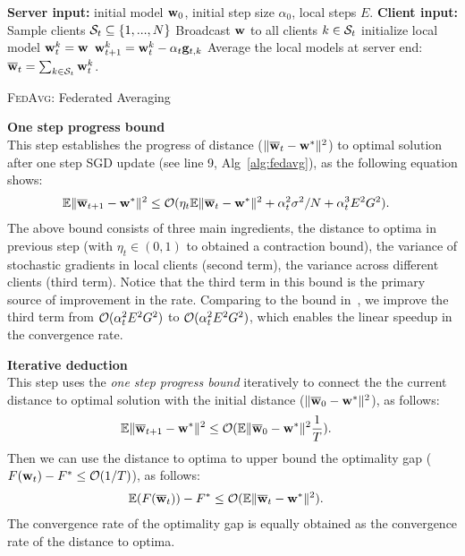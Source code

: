 \begin{algorithm}[h!]\small
\begin{algorithmic}[1]
\STATE \textbf{Server input:} initial model ${\mathbf{w}}_0$, initial step size $\alpha_0$, local steps $E$. 
\STATE \textbf{Client input:} 
\STATE  Sample clients ${\mathcal{S}}_t \subseteq \{1,...,N\}$
\STATE Broadcast ${\mathbf{w}}$ to all clients $k \in {\mathcal{S}}_t$
\STATE initialize local model ${\mathbf{w}}_t^k = {\mathbf{w}}$
\STATE ${\mathbf{w}}_{t+1}^{k}  ={\mathbf{w}}_{t}^{k}-\alpha_{t}{\mathbf{g}}_{t,k}$
\ENDFOR
\ENDFOR
\STATE Average the local models at server end: ${\overline{\mathbf{w}}}_t = \sum_{k\in {\mathcal{S}}_t} {\mathbf{w}}_t^k$.
\ENDFOR 
\end{algorithmic}
\caption{\textsc{FedAvg}: Federated Averaging}%
\label{alg:fedavg}
\end{algorithm}


\textbf{One step progress bound} \\ 
This step establishes the progress of distance ($\|{\overline{\mathbf{w}}}_{t}-{\mathbf{w}}^{\ast}\|^{2}$) to optimal solution after one step SGD update (see line 9, Alg~\ref{alg:fedavg}), as the following equation shows:
\begin{align*}
	\mathbb{E}\|{\overline{\mathbf{w}}}_{t+1}-{\mathbf{w}}^{\ast}\|^{2} & \leq {\mathcal{O}}(\eta_t\mathbb{E}\|{\overline{\mathbf{w}}}_{t}-{\mathbf{w}}^{\ast}\|^{2} + \alpha_t^2 \sigma^2/N + \alpha_t^3E^2G^2).
\end{align*}
The above bound consists of three main ingredients, the distance to optima
in previous step (with $\eta_t \in (0, 1)$ to obtained a contraction bound), 
the variance of stochastic gradients in local clients (second term), the variance
across different clients (third term). 
Notice that the third term in this bound is the primary source of improvement in the rate.  Comparing to the bound in~\cite{li2019convergence}, we improve 
the third term from ${\mathcal{O}}(\alpha_t^2E^2G^2)$ to ${\mathcal{O}}(\alpha_t^2E^2G^2)$, which enables the linear speedup in the convergence rate.


\textbf{Iterative deduction}\\
This step uses the \textit{one step progress bound} iteratively to 
connect the the current distance to optimal solution with the initial distance ($\|{\overline{\mathbf{w}}}_{0}-{\mathbf{w}}^{\ast}\|^{2}$), as follows:
\begin{align*}
	\mathbb{E}\|{\overline{\mathbf{w}}}_{t+1}-{\mathbf{w}}^{\ast}\|^{2} & \leq {\mathcal{O}}(\mathbb{E}\|{\overline{\mathbf{w}}}_{0}-{\mathbf{w}}^{\ast}\|^{2} \frac{1}{T}).
\end{align*}
Then we can use the distance to optima to upper bound the optimality gap ($F({\mathbf{w}}_t) - F^* \leq {\mathcal{O}}(1/T)$), as follows:
\begin{align*}
	\mathbb{E}(F({\overline{\mathbf{w}}}_{t}))-F^{\ast} & \leq{\mathcal{O}}(\mathbb{E}\|{\overline{\mathbf{w}}}_{t}-{\mathbf{w}}^{\ast}\|^{2}). 
\end{align*}
The convergence rate of the optimality gap is equally obtained as the convergence rate of the distance to optima.

